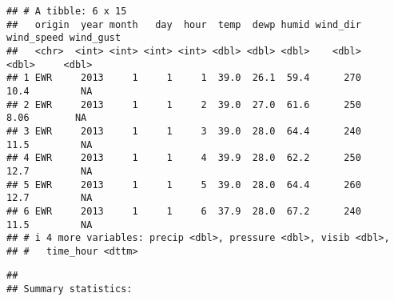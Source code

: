 \documentclass[
]{article}
\begin{document}
\begin{verbatim}
## # A tibble: 6 x 15
##   origin  year month   day  hour  temp  dewp humid wind_dir wind_speed wind_gust
##   <chr>  <int> <int> <int> <int> <dbl> <dbl> <dbl>    <dbl>      <dbl>     <dbl>
## 1 EWR     2013     1     1     1  39.0  26.1  59.4      270      10.4         NA
## 2 EWR     2013     1     1     2  39.0  27.0  61.6      250       8.06        NA
## 3 EWR     2013     1     1     3  39.0  28.0  64.4      240      11.5         NA
## 4 EWR     2013     1     1     4  39.9  28.0  62.2      250      12.7         NA
## 5 EWR     2013     1     1     5  39.0  28.0  64.4      260      12.7         NA
## 6 EWR     2013     1     1     6  37.9  28.0  67.2      240      11.5         NA
## # i 4 more variables: precip <dbl>, pressure <dbl>, visib <dbl>,
## #   time_hour <dttm>
\end{verbatim}

\begin{verbatim}
## 
## Summary statistics:
\end{verbatim}
\end{document}
